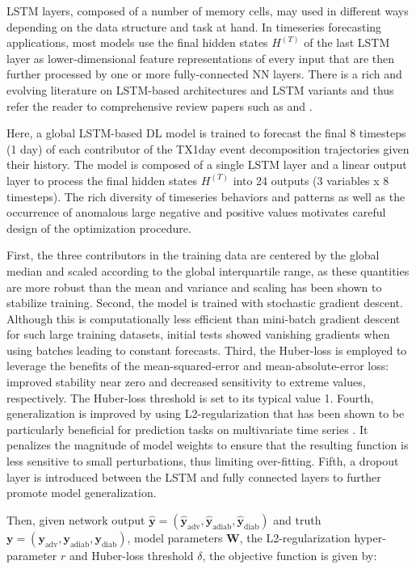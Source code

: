 \documentclass[11pt,a4paper,twoside,openright]{report}
\theoremstyle{definition}
\begin{document}
LSTM layers, composed of a number of memory cells, may used in different ways depending on the data structure and task at hand. In timeseries forecasting applications, most models use the final hidden states \(H^{(T)}\) of the last LSTM layer as lower-dimensional feature representations of every input that are then further processed by one or more fully-connected NN layers. There is a rich and evolving literature on LSTM-based architectures and LSTM variants and thus refer the reader to comprehensive review papers such as \cite{hu_time_2020} and \cite{han_review_2021}.

Here, a global LSTM-based DL model is trained to forecast the final 8 timesteps (1 day) of each contributor of the TX1day event decomposition trajectories given their history. The model is composed of a single LSTM layer and a linear output layer to process the final hidden states \(H^{(T)}\) into 24 outputs (3 variables x 8 timesteps). The rich diversity of timeseries behaviors and patterns as well as the occurrence of anomalous large negative and positive values motivates careful design of the optimization procedure.

First, the three contributors in the training data are centered by the global median and scaled according to the global interquartile range, as these quantities are more robust than the mean and variance and scaling has been shown to stabilize training. Second, the model is trained with stochastic gradient descent. Although this is computationally less efficient than mini-batch gradient descent for such large training datasets, initial tests showed vanishing gradients when using batches leading to constant forecasts. Third, the Huber-loss is employed to leverage the benefits of the mean-squared-error and mean-absolute-error loss: improved stability near zero and decreased sensitivity to extreme values, respectively. The Huber-loss threshold is set to its typical value 1. Fourth, generalization is improved by using L2-regularization that has been shown to be particularly beneficial for prediction tasks on multivariate time series \citep{zhou_explore_2019}. It penalizes the magnitude of model weights to ensure that the resulting function is less sensitive to small perturbations, thus limiting over-fitting. Fifth, a dropout layer is introduced between the LSTM and fully connected layers to further promote model generalization.

Then, given network output \(\mathbf{\hat{y}} = (\mathbf{\hat{y}}_{\text{adv}}, \mathbf{\hat{y}}_{\text{adiab}}, \mathbf{\hat{y}}_{\text{diab}})\) and truth \(\mathbf{y} = (\mathbf{y}_{\text{adv}}, \mathbf{y}_{\text{adiab}}, \mathbf{y}_{\text{diab}})\), model parameters \(\mathbf{W}\), the L2-regularization hyper-parameter \(r\) and Huber-loss threshold \(\delta\), the objective function is given by:
\end{document}
